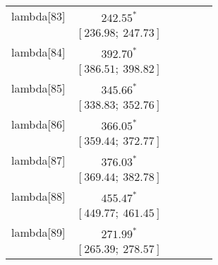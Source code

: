 \begin{table}
\begin{center}
\begin{tabular}{l c c c c c }
lambda[83]  & $242.55^{*}$                     &                           &                           &                         &                         \\
            & $[236.98;\ 247.73]$              &                           &                           &                         &                         \\
lambda[84]  & $392.70^{*}$                     &                           &                           &                         &                         \\
            & $[386.51;\ 398.82]$              &                           &                           &                         &                         \\
lambda[85]  & $345.66^{*}$                     &                           &                           &                         &                         \\
            & $[338.83;\ 352.76]$              &                           &                           &                         &                         \\
lambda[86]  & $366.05^{*}$                     &                           &                           &                         &                         \\
            & $[359.44;\ 372.77]$              &                           &                           &                         &                         \\
lambda[87]  & $376.03^{*}$                     &                           &                           &                         &                         \\
            & $[369.44;\ 382.78]$              &                           &                           &                         &                         \\
lambda[88]  & $455.47^{*}$                     &                           &                           &                         &                         \\
            & $[449.77;\ 461.45]$              &                           &                           &                         &                         \\
lambda[89]  & $271.99^{*}$                     &                           &                           &                         &                         \\
            & $[265.39;\ 278.57]$              &                           &                           &                         &                         \\

\end{tabular}
\end{center}
\end{table}
